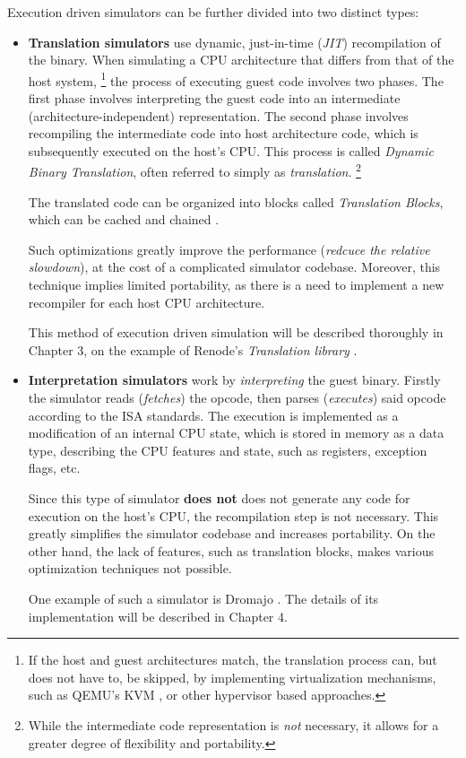 Execution driven simulators can be further divided into two distinct types:

\begin{itemize}
	\item{\textbf{Translation simulators} use dynamic, just-in-time (\textit{JIT}) recompilation of the binary.
	When simulating a CPU architecture that differs from that of the host system,%
	\footnote{If the host and guest architectures match, the translation process can, but does not have to, be skipped,
	by implementing virtualization mechanisms, such as QEMU's KVM \cite{QemuKVM}, or other hypervisor based approaches.}
	the process of executing guest code involves two phases. The first phase involves interpreting the guest code into
	an intermediate (architecture-independent) representation. The second phase involves recompiling the intermediate
	code into host architecture code, which is subsequently executed on the host's CPU. This process is called
	\textit{Dynamic Binary Translation}, often referred to simply as \textit{translation}.%
	\footnote{While the intermediate code representation is \textit{not} necessary, it allows for a greater degree of
	flexibility and portability.}

	The translated code can be organized into blocks called \textit{Translation Blocks}, which can be cached and
	chained \cite{Qemu}.

	Such optimizations greatly improve the performance (\textit{redcuce the relative slowdown}), at the
	cost of a complicated simulator codebase. Moreover, this technique implies limited portability, as there is a need
	to implement a new recompiler for each host CPU architecture.

	This method of execution driven simulation will be described thoroughly in Chapter 3, on the example of Renode's
	\textit{Translation library} \cite{Tlib}.}
	\item{\textbf{Interpretation simulators} work by \textit{interpreting} the guest binary. Firstly the simulator
	reads (\textit{fetches}) the opcode, then parses (\textit{executes}) said opcode according to the ISA standards.
	The execution is implemented as a modification of an internal CPU state, which is stored in memory as a data type,
	describing the CPU features and state, such as registers, exception flags, etc.

	Since this type of simulator \textbf{does not} does not generate any code for execution on the host's CPU, the recompilation step is not
	necessary. This greatly simplifies the simulator codebase and increases portability. On the other hand, the lack of
	features, such as translation blocks, makes various optimization techniques not possible.

	One example of such a simulator is Dromajo \cite{Dromajo}. The details of its implementation will be described in
	Chapter 4.}
\end{itemize}


